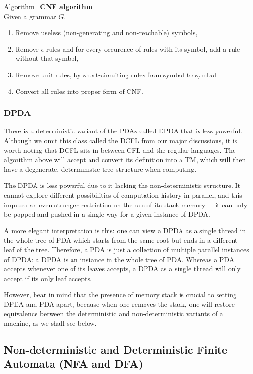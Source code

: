 \documentclass[12pt]{article}  %
\newcommand{\algtitle}[1]{\underline{Algorithm \ {\bf #1}} \vspace*{1mm}\\}
\begin{document}
\algtitle{CNF algorithm}
Given a grammar $G$,
\begin{enumerate}
	\item Remove useless (non-generating and non-reachable) symbols,
	\item Remove $\epsilon$-rules and for every occurence of rules with its symbol, add a rule without that symbol,
	\item Remove unit rules, by short-circuiting rules from symbol to symbol,
	\item Convert all rules into proper form of CNF.
\end{enumerate}

\subsubsection{DPDA}

There is a deterministic variant of the PDAs called DPDA that is less powerful. Although we omit this class called the DCFL from our major discussions, it is worth noting that DCFL sits in between CFL and the regular languages. The algorithm above will accept and convert its definition into a TM, which will then have a degenerate, deterministic tree structure when computing.

The DPDA is less powerful due to it lacking the non-deterministic structure. It cannot explore different possibilities of computation history in parallel, and this imposes an even stronger restriction on the use of its stack memory $-$ it can only be popped and pushed in a single way for a given instance of DPDA. 

A more elegant interpretation is this: one can view a DPDA as a single thread in the whole tree of PDA which starts from the same root but ends in a different leaf of the tree. Therefore, a PDA is just a collection of multiple parallel instances of DPDA; a DPDA is an instance in the whole tree of PDA. Whereas a PDA accepts whenever one of its leaves accepts, a DPDA as a single thread will only accept if its only leaf accepts. 

However, bear in mind that the presence of memory stack is crucial to setting DPDA and PDA apart, because when one removes the stack, one will restore equivalence between the deterministic and non-deterministic variants of a machine, as we shall see below.



\subsection{Non-deterministic and Deterministic Finite Automata (NFA and DFA)}
\end{document}
